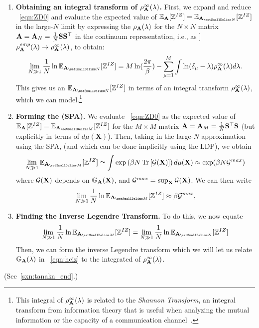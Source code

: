 \begin{enumerate}
   \item
   \textbf{Obtaining an integral transform of $\rho^{\infty}_{\mathbf{A}}(\lambda)$.}
   First, we expand and reduce \EQN~\ref{eqn:ZD0} and evaluate the expected value of
   $\EZDA=\EZDATWO$ in the large-$N$ limit by expressing the $\rho_{\mathbf{A}}(\lambda)$
   for the $N\times N$ matrix $\mathbf{A}=\mathbf{A}_N=\tfrac{1}{N}{\mathbf{S}}{\mathbf{S}}^{\top}$
   in the continuum representation, i.e., as ]
   $\rho^{emp}_{\mathbf{A}}(\lambda)\rightarrow \rho^{\infty}_{\mathbf{A}}(\lambda)$, to obtain:
   \begin{equation}
      \label{eqn:ZD_step1}
      \lim_{N\gg 1}\dfrac{1}{N}
      \ln\EZDATWO =M\ln(\dfrac{2\pi}{\beta})-\sum_{\mu=1}^{M}\int \ln(\delta_{\mu}-\lambda)\rho^{\infty}_{\AMAT}(\lambda)d\lambda  .
   \end{equation}
   This gives us an $\EZDATWO$ in terms of an integral transform $\rho^{\infty}_{\mathbf{A}}(\lambda)$, which we can model.\footnote{This integral of $\rho^{\infty}_{\mathbf{A}}(\lambda)$  is related to the \emph{Shannon Transform}, an integral transform from information theory that is useful when analyzing the mutual information or the capacity of a communication channel~\cite{Tanaka2007}. }
   \item
   \textbf{Forming the \SaddlePointApproximation (SPA).}
   We evaluate \EQN~\ref{eqn:ZD0} as the expected value of $\EZDA=\EZDAONE$
   for the $M \times M$ matrix $\mathbf{A}=\mathbf{A}_M=\tfrac{1}{N}{\mathbf{S}}^{\top}{\mathbf{S}}$
   (but explicitly in terms of $d\mu(\mathbf{X})$).
   Then, taking in the large-$N$ approximation using the SPA,
    (and which can be done implicitly using the LDP), we obtain
   \begin{equation}  
  \label{eqn:ZD1} 
  \lim_{N \gg 1} \EZDAONE\simeq\int  \exp\left(\beta N\Trace{\GFANCY}\right)d\mu(\mathbf{X}) \approx \exp(\beta N\GMAX)
\end{equation}
  where  $\mathcal{G}(\mathbf{X})$ depends on $\mathbb{G}_{\mathbf{A}}(\mathbf{X})$, and $\mathcal{G}^{max}=\sup_{\mathbf{X}}\mathcal{G}(\mathbf{X})$.
  We can then write
   \begin{equation}
      \label{eqn:ZD_step2}
      \lim_{N \gg 1}\dfrac{1}{N}\ln\EZDAONE \approx \beta\GMAX  ,
   \end{equation}

 \item
 \textbf{Finding the Inverse Legendre Transform.}
  To do this, we now equate
  \begin{equation}
  \lim_{N \gg 1}\frac{1}{N}\ln\EZDAONE=  \lim_{N \gg 1}\frac{1}{N}\ln\EZDATWO
  \end{equation}
 Then, we can form the
 inverse Legendre transform  which we will let us relate $\mathbb{G}_{\mathbf{A}}(\lambda)$ in \EQN~\ref{eqn:hciz} to the integrated \RTransform of $\rho^{\infty}_{\mathbf{A}}(\lambda)$.
\end{enumerate}

\noindent

(See~\ref{sxn:tanaka_end}.)


